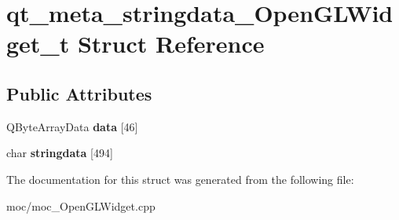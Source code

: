 \hypertarget{structqt__meta__stringdata___open_g_l_widget__t}{\section{qt\-\_\-meta\-\_\-stringdata\-\_\-\-Open\-G\-L\-Widget\-\_\-t Struct Reference}
\label{structqt__meta__stringdata___open_g_l_widget__t}
}
\subsection*{Public Attributes}
\begin{DoxyCompactItemize}
\item 
\hypertarget{structqt__meta__stringdata___open_g_l_widget__t_a4ce4865f07ea977452665daad2e78032}{Q\-Byte\-Array\-Data {\bfseries data} \mbox{[}46\mbox{]}}\label{structqt__meta__stringdata___open_g_l_widget__t_a4ce4865f07ea977452665daad2e78032}

\item 
\hypertarget{structqt__meta__stringdata___open_g_l_widget__t_a9b9af1c5937a500e235481279d4355c5}{char {\bfseries stringdata} \mbox{[}494\mbox{]}}\label{structqt__meta__stringdata___open_g_l_widget__t_a9b9af1c5937a500e235481279d4355c5}

\end{DoxyCompactItemize}


The documentation for this struct was generated from the following file\-:\begin{DoxyCompactItemize}
\item 
moc/moc\-\_\-\-Open\-G\-L\-Widget.\-cpp\end{DoxyCompactItemize}

